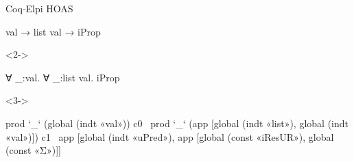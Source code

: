 \documentclass[aspectratio=169]{beamer}
\begin{document}
\begin{frame}[fragile]{Coq-Elpi HOAS}
    \begin{coqcode}
        val → list val → iProp
    \end{coqcode}%
    \begin{uncoverenv}<2->%
        \vspace*{-.8cm}
        \begin{coqcode}
            ∀ _:val. ∀ _:list val. iProp
        \end{coqcode}
    \end{uncoverenv}
    \begin{uncoverenv}<3->
        \vspace*{-.2cm}
        \begin{elpicode}
            prod `_` (global (indt «val»)) 
                 c0 \
                    prod `_` (app [global (indt «list»), 
                                   global (indt «val»)]) 
                         c1 \
                            app [global (indt «uPred»), 
                                app [global (const «iResUR»), 
                                global (const «Σ»)]]
        \end{elpicode}
    \end{uncoverenv}
\end{frame}
\end{document}
